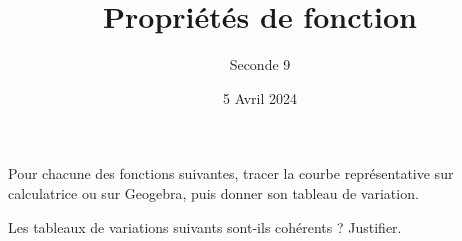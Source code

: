 \documentclass{exam}
\title{Propriétés de fonction}
\date{5 Avril 2024}
\author{Seconde 9}
\begin{document}
\maketitle
\thispagestyle{empty}
\begin{minipage}{0.45\textwidth}
\begin{questions}
\question Pour chacune des fonctions suivantes, tracer la courbe représentative sur calculatrice ou sur Geogebra, puis donner son tableau de variation.
\question Les tableaux de variations suivants sont-ils cohérents ? Justifier.


\end{questions}
\end{minipage}
\end{document}
